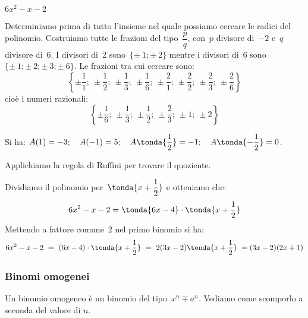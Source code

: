 \begin{esempio}
\(6x^{2}-x-2\)

Determiniamo prima di tutto l'insieme nel quale
possiamo cercare le radici del polinomio. Costruiamo tutte le frazioni
del tipo~\(\dfrac{p}{q}\), con~\(p\) divisore di~\(-2\) e~\(q\) divisore 
di~\(6\). I
divisori di~2 sono~\(\{\pm~1;\pm~2\}\) 
mentre i divisori di~6 sono~\(\{\pm~1;\pm~2;\pm~3;\pm~6\}\).
Le frazioni tra cui cercare sono:
\[\left\{
\pm \dfrac{1}{1};~\pm \dfrac{1}{2};~\pm \dfrac{1}{3};~\pm \dfrac{1}{6};~
\pm \dfrac{2}{1};~\pm \dfrac{2}{2};~\pm \dfrac{2}{3};~\pm \dfrac{2}{6}\right\}\]
cioè i numeri razionali:
\[
\left\{
\pm \dfrac{1}{6};~\pm \dfrac{1}{3};~\pm \dfrac{1}{2};~\pm \dfrac{2}{3};~
\pm 1;~\pm 2 \right\}\]

Si ha: \quad \(A(1)=-3; \quad A(-1)=5; \quad A\tonda{\dfrac{1}{2}}=-1; 
       \quad A\tonda{-\dfrac{1}{2}}=0\).
       
Applichiamo la regola di Ruffini per trovare il quoziente.



{
Dividiamo il polinomio per~\(\tonda{x+\dfrac{1}{2}}\) e otteniamo che:
\vspace{-2mm}
\[6x^{2}-x-2 = \tonda{6x-4} \cdot \tonda{x+\dfrac{1}{2}}\]
}
{
\hspace{5mm} \scompruffinid 
}
Mettendo a fattore comune~2 nel primo binomio si ha:
\[6x^{2}-x-2\ =
\ (6x-4)\cdot \tonda{x+\dfrac{1}{2}}\ =
\ 2(3x-2)\tonda{x+\dfrac{1}{2}}\ =(3x-2)(2x+1)\]
\end{esempio}




\subsubsection{Binomi omogenei}
\label{subsubsec:divpol_binomo}

Un binomio omogeneo è un binomio del tipo~\(x^{n} \mp a^{n}\).
Vediamo come scomporlo a seconda del valore di \(n\).

